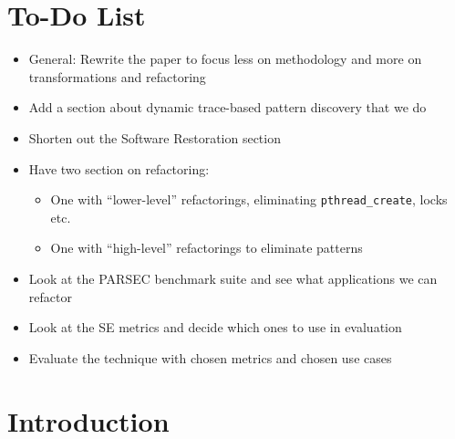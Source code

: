 \section{To-Do List}

\begin{itemize}
\item General: Rewrite the paper to focus less on methodology and more on transformations and refactoring
\item Add a section about dynamic trace-based pattern discovery that we do
\item Shorten out the Software Restoration section
\item Have two section on refactoring:
  \begin{itemize}
  \item One with ``lower-level'' refactorings, eliminating \lstinline{pthread_create}, locks etc.
    \item One with ``high-level'' refactorings to eliminate patterns
    \end{itemize}
  \item Look at the PARSEC benchmark suite and see what applications we can refactor
  \item Look at the SE metrics and decide which ones to use in evaluation
    \item Evaluate the technique with chosen metrics and chosen use cases
 \end{itemize}

\section{Introduction}

